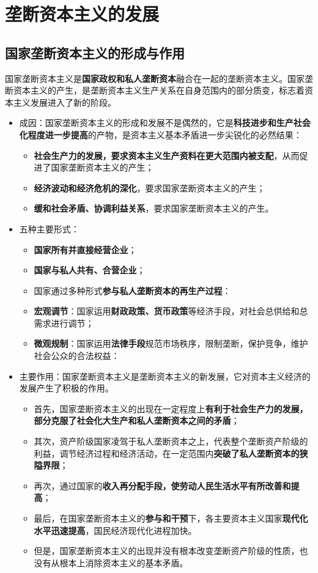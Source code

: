\documentclass[12pt,openany]{ctexbook}
\begin{document}
\section{垄断资本主义的发展}
\subsection{国家垄断资本主义的形成与作用}
\begin{mdquote}
国家垄断资本主义是\textbf{国家政权和私人垄断资本}融合在一起的垄断资本主义。国家垄断资本主义的产生，是垄断资本主义生产关系在自身范围内的部分质变，标志着资本主义发展进入了新的阶段。
\end{mdquote}
\begin{itemize}
  \item 成因：国家垄断资本主义的形成和发展不是偶然的，它是\textbf{科技进步和生产社会化程度进一步提高}的产物，是资本主义基本矛盾进一步尖锐化的必然结果：
\begin{itemize}
  \item \textbf{社会生产力的发展，要求资本主义生产资料在更大范围内被支配}，从而促进了国家垄断资本主义的产生；
  \item \textbf{经济波动和经济危机的深化}，要求国家垄断资本主义的产生；
  \item \textbf{缓和社会矛盾、协调利益关系}，要求国家垄断资本主义的产生。
\end{itemize}
  \item 五种主要形式：
\begin{itemize}
  \item \textbf{国家所有并直接经营企业}；
  \item \textbf{国家与私人共有、合营企业}；
  \item 国家通过多种形式\textbf{参与私人垄断资本的再生产过程}：
  \item \textbf{宏观调节}：国家运用\textbf{财政政策、货币政策}等经济手段，对社会总供给和总需求进行调节；
  \item \textbf{微观规制}：国家运用\textbf{法律手段}规范市场秩序，限制垄断，保护竞争，维护社会公众的合法权益：
\end{itemize}
  \item 主要作用：国家垄断资本主义是垄断资本主义的新发展，它对资本主义经济的发展产生了积极的作用。
\begin{itemize}
  \item 首先，国家垄断资本主义的出现在一定程度上\textbf{有利于社会生产力的发展，部分克服了社会化大生产和私人垄断资本之间的矛盾}；
  \item 其次，资产阶级国家凌驾于私人垄断资本之上，代表整个垄断资产阶级的利益，调节经济过程和经济活动，在一定范围内\textbf{突破了私人垄断资本的狭隘界限}；
  \item 再次，通过国家的\textbf{收入再分配手段，使劳动人民生活水平有所改善和提高}；
  \item 最后，在国家垄断资本主义的\textbf{参与和干预}下，各主要资本主义国家\textbf{现代化水平迅速提高}，国民经济现代化进程加快。
  \item 但是，国家垄断资本主义的出现并没有根本改变垄断资产阶级的性质，也没有从根本上消除资本主义的基本矛盾。
\end{itemize}
\end{itemize}
\end{document}
